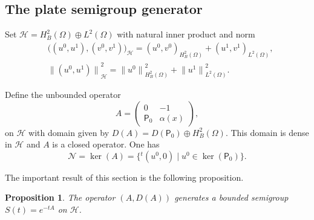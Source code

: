 \documentclass[10pt]{amsart}
\let\sep\mid
\theoremstyle{plain}
\newtheorem{proposition}[theorem]{Proposition}
\theoremstyle{definition}
\newcommand{\inp}[2]{(#1, #2)}
\newcommand{\biginp}[2]{\big(#1, #2 \big)}
\renewcommand{\H}{{\mathcal H}}
\newcommand{\transp}{\ensuremath{\phantom{}^{t}}}
\newcommand{\Norm}[2]{{\| #1 \|}_{#2}}
\newcommand{\bigNorm}[2]{{\big\| #1 \big\|}_{#2}}
\newcommand{\Pell}{\mathsf P_0}
\begin{document}
\subsection{The plate semigroup generator}
\label{sec: The plate semigroup generator}
Set $\H = H^2_B (\Omega) \oplus L^2(\Omega)$ with natural inner
product and norm
\begin{align}
\label{eq: norm H}
&\biginp{(u^0,u^1)}{(v^0,v^1)}_{\H} = \inp{u^0}{v^0}_{H^2_B(\Omega)} +
\inp{u^1}{v^1}_{L^2(\Omega)}, \\
&\bigNorm{(u^0,u^1)}{\H}^2 = \Norm{u^0}{H^2_B(\Omega)}^2 + \Norm{u^1}{L^2(\Omega)}^2.
\end{align}

Define the unbounded operator
\begin{equation}
\label{eq: generator damped plate}
A = \begin{pmatrix} 0 & -1\\ \Pell & \alpha(x) \end{pmatrix},
\end{equation}
on $\H$
with domain given by $D(A) = D(\Pell) \oplus H^2_B(\Omega)$.
This domain is dense in $\H$ and $A$ is a closed operator. One has
\begin{equation*}
\mathcal N = \ker (A) = \big\{ \transp (u^0, 0)\sep u^0 \in \ker
(\Pell)\big\}.
\end{equation*}

The important result of this section is the following proposition.

\begin{proposition}
\label{prop: A semigroup generator}
The operator $(A, D(A))$ generates a bounded semigroup $S(t) = e^{-t
A}$ on $\H$.
\end{proposition}
\end{document}
